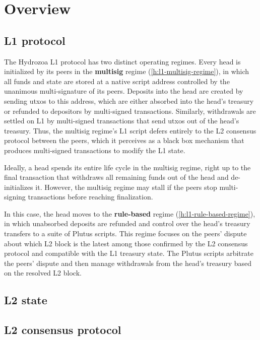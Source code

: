 \documentclass[../hydrozoa.tex]{subfiles}
\begin{document}
\chapter*{Overview}%
\label{h:overview-introduction}%
%


\section*{L1 protocol}%
\label{h:overview-l1-protocol}%
%

The Hydrozoa L1 protocol has two distinct operating regimes.
Every head is initialized by its peers in the \textbf{multisig} regime (\cref{h:l1-multisig-regime}), in which all funds and state are stored at a native script address controlled by the unanimous multi-signature of its peers.
Deposits into the head are created by sending utxos to this address, which are either absorbed into the head's treasury or refunded to depositors by multi-signed transactions.
Similarly, withdrawals are settled on L1 by multi-signed transactions that send utxos out of the head's treasury.
Thus, the multisig regime's L1 script defers entirely to the L2 consensus protocol between the peers, which it perceives as a black box mechanism that produces multi-signed transactions to modify the L1 state.

Ideally, a head spends its entire life cycle in the multisig regime, right up to the final transaction that withdraws all remaining funds out of the head and de-initializes it.
However, the multisig regime may stall if the peers stop multi-signing transactions before reaching finalization.

In this case, the head moves to the \textbf{rule-based} regime (\cref{h:l1-rule-based-regime}), in which unabsorbed deposits are refunded and control over the head's treasury transfers to a suite of Plutus scripts. 
This regime focuses on the peers' dispute about which L2 block is the latest among those confirmed by the L2 consensus protocol and compatible with the L1 treasury state.
The Plutus scripts arbitrate the peers' dispute and then manage withdrawals from the head's treasury based on the resolved L2 block.


\section*{L2 state}%
\label{h:overview-l2-state}%
%


\section*{L2 consensus protocol}%
\label{h:overview-l2-consensus-protocol}%
%

\end{document}
